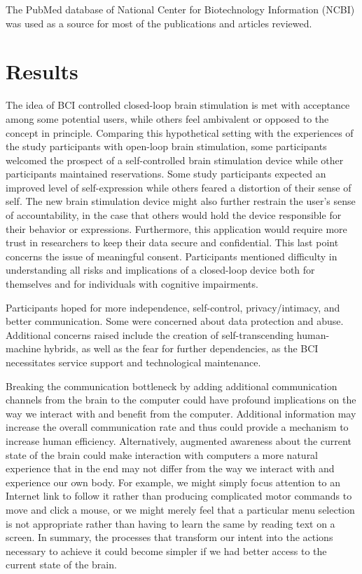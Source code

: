 \documentclass[fleqn,11pt]{olplainarticle}
\begin{document}
The PubMed database of  National Center for Biotechnology Information (NCBI) was used as a source for most of the publications and articles reviewed.

\section*{Results}
The idea of BCI controlled closed-loop brain stimulation is met with acceptance among some potential users, while others feel ambivalent or opposed to the concept in principle. Comparing this hypothetical setting with the experiences of the study participants with open-loop brain stimulation, some participants welcomed the prospect of a self-controlled brain stimulation device while other participants maintained reservations. Some study participants expected an improved level of self-expression while others feared a distortion of their sense of self. The new brain stimulation device might also further restrain the user’s sense of accountability, in the case that others would hold the device responsible for their behavior or expressions. Furthermore, this application would require more trust in researchers to keep their data secure and confidential. This last point concerns the issue of meaningful consent. Participants mentioned difficulty in understanding all risks and implications of a closed-loop device both for themselves and for individuals with cognitive impairments. \cite{kogel2019using}

Participants hoped for more independence, self-control, privacy/intimacy, and better communication. Some were concerned about data protection and abuse. Additional concerns raised include the creation of self-transcending human-machine hybrids, as well as the fear for further dependencies, as the BCI necessitates service support and technological maintenance. \cite{kogel2019using}

Breaking the communication bottleneck by adding additional communication channels from the brain to the computer could have profound implications on the way we interact with and benefit from the computer. Additional information may increase the overall communication rate and thus could provide a mechanism to increase human efficiency. Alternatively, augmented awareness about the current state of the brain could make interaction with computers a more natural experience that in the end may not differ from the way we interact with and experience our own body. For example, we might simply focus attention to an Internet link to follow it rather than producing complicated motor commands to move and click a mouse, or we might merely feel that a particular menu selection is not appropriate rather than having to learn the same by reading text on a screen. In summary, the processes that transform our intent into the actions necessary to achieve it could become simpler if we had better access to the current state of the brain. \cite{schalk2008brain}
\end{document}
